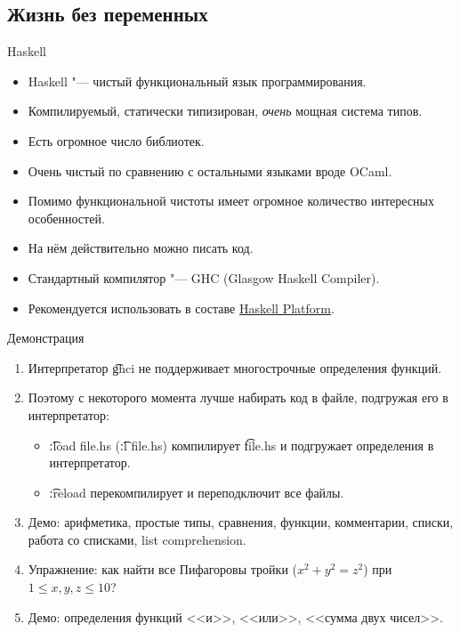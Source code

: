 \subsection{Жизнь без переменных}

\begin{frame}{Haskell}
	\begin{itemize}
		\item Haskell "--- чистый функциональный язык программирования.
		\item Компилируемый, статически типизирован, \textit{очень} мощная система типов.
		\item Есть огромное число библиотек.
		\item Очень чистый по сравнению с остальными языками вроде OCaml.
		\item Помимо функциональной чистоты имеет огромное количество интересных особенностей.
		\item На нём действительно можно писать код.
		\item Стандартный компилятор "--- GHC (Glasgow Haskell Compiler).
		\item Рекомендуется использовать в составе \href{https://www.haskell.org/platform/}{Haskell Platform}.
	\end{itemize}
\end{frame}

\begin{frame}{Демонстрация}
	\begin{enumerate}
		\item Интерпретатор \t{ghci} не поддерживает многострочные определения функций.
		\item Поэтому с некоторого момента лучше набирать код в файле, подгружая его в интерпретатор:
			\begin{itemize}
				\item \t{:load file.hs} (\t{:l file.hs}) компилирует \t{file.hs} и подгружает определения в интерпретатор.
				\item \t{:reload} перекомпилирует и переподключит все файлы.
			\end{itemize}
		\item Демо: арифметика, простые типы, сравнения, функции, комментарии, списки, работа со списками, list comprehension.
		\item Упражнение: как найти все Пифагоровы тройки ($x^2 + y^2 = z^2$) при $1 \le x, y, z \le 10$?
		\item Демо: определения функций <<и>>, <<или>>, <<сумма двух чисел>>.
	\end{enumerate}
\end{frame}

